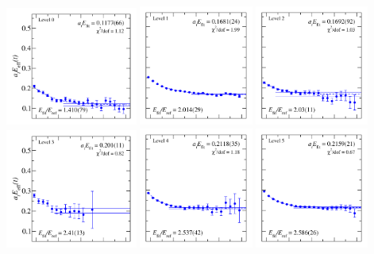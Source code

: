 \documentclass[varwidth,convert]{standalone}
\begin{document}
\includegraphics[width=0.325\textwidth]{fit_0.pdf}
\includegraphics[width=0.28\textwidth]{fit_2.pdf}
\includegraphics[width=0.28\textwidth]{fit_1.pdf}
\includegraphics[width=0.325\textwidth]{fit_3.pdf}
\includegraphics[width=0.28\textwidth]{fit_4.pdf}
\includegraphics[width=0.28\textwidth]{fit_5.pdf}
\end{document}
